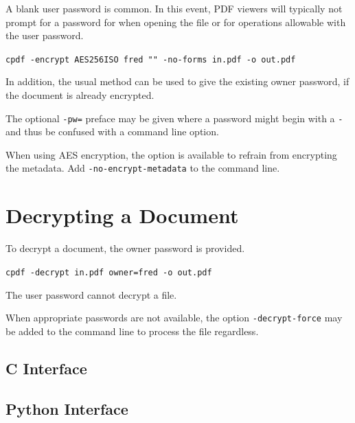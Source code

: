 \documentclass{book}
\begin{document}
  \noindent A blank user password is
common. In this event, PDF viewers will typically not prompt for a
password for when opening the file or for operations allowable with the user password.

  \begin{framed}
    \vspace{1.5mm}
    \noindent\small\verb!cpdf -encrypt AES256ISO fred "" -no-forms in.pdf -o out.pdf!
  \end{framed}

\noindent In addition, the usual method can be used to give the existing owner
password, if the document is already encrypted.

The optional \texttt{-pw=} preface may be given where a password might begin with a \texttt{-} and thus be confused with a command line option.

When using AES encryption, the option is available to refrain from encrypting the
metadata. Add \texttt{-no-encrypt-metadata} to the command line.

  \section{Decrypting a Document}
  To decrypt a document, the owner password is provided.

  \begin{framed}
    \noindent\small\verb!cpdf -decrypt in.pdf owner=fred -o out.pdf!
  \end{framed}

  \noindent The user password cannot decrypt a file.

When appropriate passwords are not available, the option \texttt{-decrypt-force} may be added to the command line to process the file regardless.


\begin{cpdflib}
\clearpage
\section*{C Interface}
\begin{small}\tt

\end{small}
\end{cpdflib}

\begin{pycpdflib}
\clearpage
\section*{Python Interface}
\begin{small}\tt

\end{small}
\end{pycpdflib}
\end{document}
